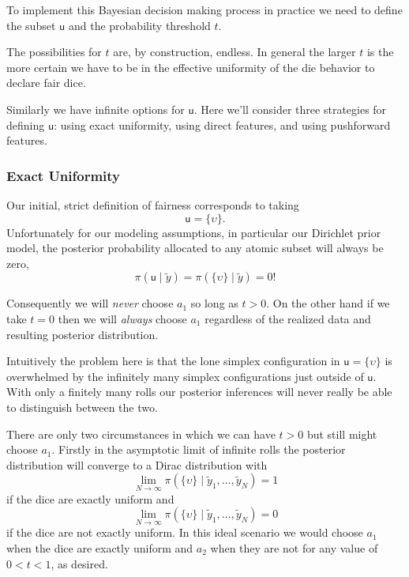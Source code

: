 \documentclass[
  letterpaper,
  DIV=11,
  numbers=noendperiod]{scrartcl}
\begin{document}
To implement this Bayesian decision making process in practice we need
to define the subset \(\mathsf{u}\) and the probability threshold \(t\).

The possibilities for \(t\) are, by construction, endless. In general
the larger \(t\) is the more certain we have to be in the effective
uniformity of the die behavior to declare fair dice.

Similarly we have infinite options for \(\mathsf{u}\). Here we'll
consider three strategies for defining \(\mathsf{u}\): using exact
uniformity, using direct features, and using pushforward features.

\subsubsection{Exact Uniformity}\label{exact-uniformity}

Our initial, strict definition of fairness corresponds to taking \[
\mathsf{u} = \{ \upsilon \}.
\] Unfortunately for our modeling assumptions, in particular our
Dirichlet prior model, the posterior probability allocated to any atomic
subset will always be zero, \[
\pi( \mathsf{u} \mid \tilde{y} ) = \pi( \{ \upsilon \} \mid \tilde{y} ) = 0!
\]

Consequently we will \emph{never} choose \(a_{1}\) so long as \(t > 0\).
On the other hand if we take \(t = 0\) then we will \emph{always} choose
\(a_{1}\) regardless of the realized data and resulting posterior
distribution.

Intuitively the problem here is that the lone simplex configuration in
\(\mathsf{u} = \{ \upsilon \}\) is overwhelmed by the infinitely many
simplex configurations just outside of \(\mathsf{u}\). With only a
finitely many rolls our posterior inferences will never really be able
to distinguish between the two.

There are only two circumstances in which we can have \(t > 0\) but
still might choose \(a_{1}\). Firstly in the asymptotic limit of
infinite rolls the posterior distribution will converge to a Dirac
distribution with \[
\lim_{N \rightarrow \infty}
\pi( \{ \upsilon \} \mid \tilde{y}_{1}, \ldots, \tilde{y}_{N}) = 1
\] if the dice are exactly uniform and \[
\lim_{N \rightarrow \infty}
\pi( \{ \upsilon \} \mid \tilde{y}_{1}, \ldots, \tilde{y}_{N}) = 0
\] if the dice are not exactly uniform. In this ideal scenario we would
choose \(a_{1}\) when the dice are exactly uniform and \(a_{2}\) when
they are not for any value of \(0 < t < 1\), as desired.
\end{document}
